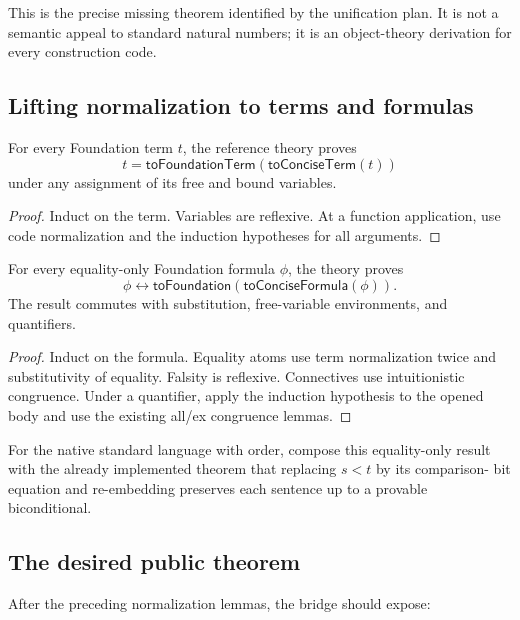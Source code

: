 This is the precise missing theorem identified by the unification plan.  It is
not a semantic appeal to standard natural numbers; it is an object-theory
derivation for every construction code.

\subsection{Lifting normalization to terms and formulas}

\begin{corollary}
For every Foundation term \(t\), the reference theory proves
\[
  t=\mathsf{toFoundationTerm}(\mathsf{toConciseTerm}(t))
\]
under any assignment of its free and bound variables.
\end{corollary}

\begin{proof}
Induct on the term.  Variables are reflexive.  At a function application, use
code normalization and the induction hypotheses for all arguments.
\end{proof}

\begin{corollary}
For every equality-only Foundation formula \(\phi\), the theory proves
\[
 \phi\leftrightarrow
 \mathsf{toFoundation}(\mathsf{toConciseFormula}(\phi)).
\]
The result commutes with substitution, free-variable environments, and
quantifiers.
\end{corollary}

\begin{proof}
Induct on the formula.  Equality atoms use term normalization twice and
substitutivity of equality.  Falsity is reflexive.  Connectives use
intuitionistic congruence.  Under a quantifier, apply the induction hypothesis
to the opened body and use the existing all/ex congruence lemmas.
\end{proof}

For the native standard language with order, compose this equality-only result
with the already implemented theorem that replacing \(s<t\) by its comparison-
bit equation and re-embedding preserves each sentence up to a provable
biconditional.

\subsection{The desired public theorem}

After the preceding normalization lemmas, the bridge should expose:

